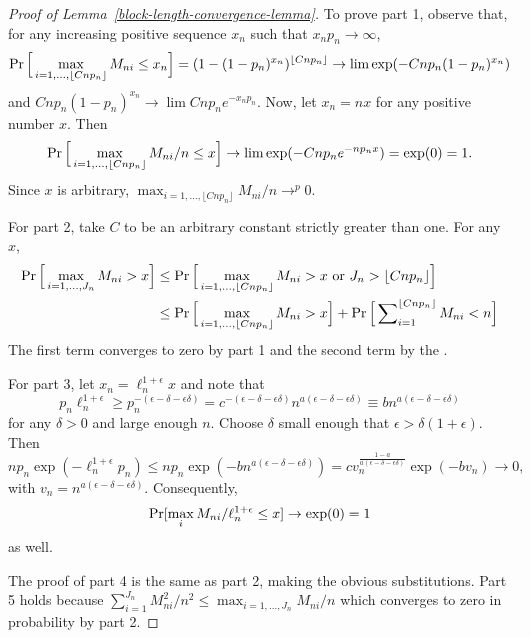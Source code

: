 \documentclass[11pt]{article}
\begin{document}
\begin{proof}[Proof of Lemma~\ref{block-length-convergence-lemma}]
  To prove part 1, observe that, for any increasing positive sequence
  $x_n$ such that $x_n p_n \to \infty$,
  \begin{equation*}
    \operatorname{Pr}\Big[\max_{i=1,\dots, \lfloor C n p_n \rfloor} M_{ni} \leq x_n\Big] =
    (1 - (1 - p_n)^{x_n})^{\lfloor C n p_n \rfloor} \to \lim \exp(-C n p_n (1 - p_n)^{x_n})
  \end{equation*}
  and $C n p_n (1 - p_n)^{x_n} \to \lim C n p_n e^{-x_n p_n}$. Now, let
  $x_n = n x$ for any positive number $x$.  Then
  \begin{equation*}
    \operatorname{Pr}\Big[\max_{i=1,\dots,\lfloor C n p_n \rfloor} M_{ni}/n \leq x \Big] \to
    \lim \exp(-C n p_n e^{-n p_n x}) =
    \exp(0) = 1.
  \end{equation*}
  Since $x$ is arbitrary, $\max_{i=1,\dots,\lfloor C n p_n \rfloor} M_{ni} / n \to^p 0$.

  For part 2, take $C$ to be an arbitrary constant strictly greater
  than one. For any $x$,
  \begin{align*}
    \operatorname{Pr}\Big[\max_{i=1,\dots,J_n} M_{ni} > x\Big] & \leq
    \operatorname{Pr}\Big[\max_{i=1,\dots,\lfloor C n p_n \rfloor} M_{ni} > x
    \text{\ or\ } J_n > \lfloor C n p_n \rfloor\Big] \\
    & \leq \operatorname{Pr}\Big[\max_{i=1,\dots,\lfloor C n p_n \rfloor} M_{ni} > x\Big]
    + \operatorname{Pr}\Big[\sum\nolimits_{i=1}^{\lfloor C n
      p_n \rfloor} M_{ni} < n \Big]
  \end{align*}
  The first term converges to zero by part 1 and the second term by
  the \lln.

  For part 3, let $x_n = \ell_n^{1 + \epsilon} x$ and note that
  \begin{equation*}
    p_n \ell_n^{1+\epsilon} \geq p_n^{-(\epsilon-\delta-\epsilon\delta)} =
    c^{-(\epsilon-\delta-\epsilon\delta)}
    n^{a(\epsilon-\delta-\epsilon\delta)} \equiv b n^{a(\epsilon
      - \delta - \epsilon\delta)}
  \end{equation*}
  for any $\delta > 0$ and large enough $n$.  Choose $\delta$ small
  enough that $\epsilon > \delta(1 +\epsilon)$. Then
  \begin{equation*}
    n p_n \exp(-\ell_n^{1+\epsilon} p_n) \leq n p_n
    \exp(-b n^{a(\epsilon -
      \delta - \epsilon\delta)}) = c
    v_n^{\frac{1-a}{a(\epsilon-\delta-\epsilon\delta)}}
    \exp(-b v_n) \to 0,
  \end{equation*}
  with $v_n = n^{a(\epsilon-\delta-\epsilon\delta)}$.  Consequently,
  \begin{equation*}
    \operatorname{Pr}[\max_i M_{ni}/\ell_n^{1+\epsilon} \leq x ] \to \exp(0) = 1
  \end{equation*}
  as well.

  The proof of part 4 is the same as part 2, making the obvious
  substitutions. Part 5 holds because $\sum_{i=1}^{J_n} M_{ni}^2/n^2
  \leq \max_{i=1,\dots,J_n} M_{ni}/n$ which converges to zero in
  probability by part 2.
\end{proof}
\end{document}
